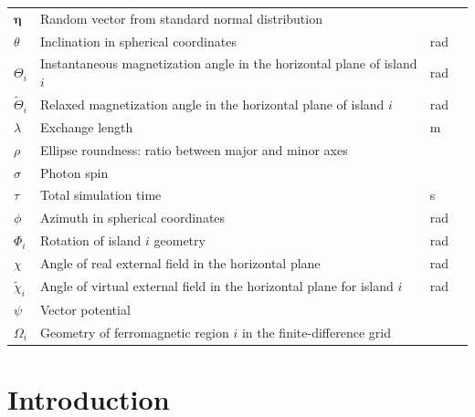 \documentclass[11pt,a4paper,english]{article}
\renewcommand{\vec}[1]{\boldsymbol{#1}}
\begin{document}
\begin{longtable}{llll}
$\vec{\eta}$ & Random vector from standard normal distribution &  \\
$\theta$ & Inclination in spherical coordinates & \si{\radian} \\
$\Theta_i$ & Instantaneous magnetization angle in the horizontal plane of island $i$ & \si{\radian} \\
$\widetilde{\Theta}_i$ & Relaxed magnetization angle in the horizontal plane of island $i$ & \si{\radian} \\
$\lambda$ & Exchange length & \si{\metre} \\
$\rho$ & Ellipse roundness: ratio between major and minor axes &  \\
$\sigma$ & Photon spin & \si{} \\
$\tau$ & Total simulation time & \si{\second} \\
$\phi$ & Azimuth in spherical coordinates & \si{\radian} \\
$\Phi_i$ & Rotation of island $i$ geometry & \si{\radian} \\
$\chi$ & Angle of real external field in the horizontal plane & \si{\radian} \\
$\widetilde{\chi}_i$ & Angle of virtual external field in the horizontal plane for island $i$ & \si{\radian} \\
$\psi$ & Vector potential & \\
$\Omega_i$ & Geometry of ferromagnetic region $i$ in the finite-difference grid & \\
\bottomrule
\end{longtable}



\clearpage
{}
\section{Introduction}
\end{document}
